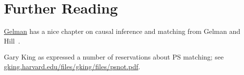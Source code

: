 \section{Further Reading}
\href{http://www.stat.columbia.edu/~gelman/arm/chap10.pdf}{Gelman} has
a nice chapter on causal inference and matching from Gelman and
Hill~\cite{gel06dat}.

Gary King as expressed a number of reservations about PS
matching; see\\ \href{https://gking.harvard.edu/files/gking/files/psnot.pdf}{gking.harvard.edu/files/gking/files/psnot.pdf}.
